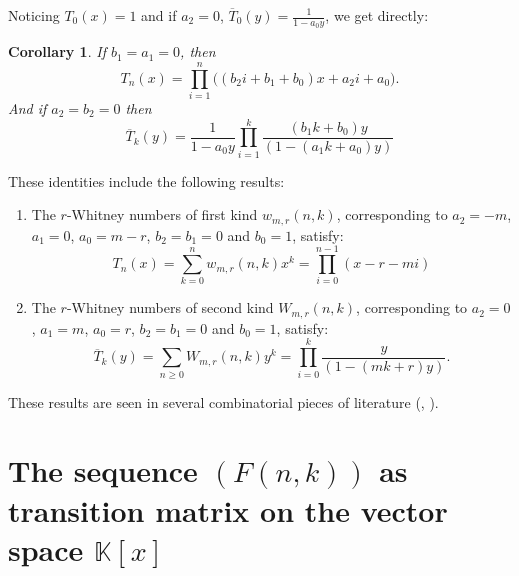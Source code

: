 \documentclass[12pt,a4paper]{article}
\newtheorem{corollary}[theorem]{Corollary}%
\theoremstyle{definition} %
\theoremstyle{remark}
\theoremstyle{examples}
\begin{document}
\noindent Noticing $T_0(x)=1$ and if $a_2=0$, $\overline{T}_0(y)=\frac{1}{1-a_0y}$, we get directly:
\begin{corollary}
	If $b_1=a_1=0$, then 
	\begin{equation}
	T_n(x)=\prod_{i=1}^n\big((b_2i+b_1+b_0)x+a_2i+a_0\big).
	\end{equation}
	And if $a_2=b_2=0$ then 
	\begin{equation}
\overline{T}_k(y)= \frac{1}{1-a_0y}\prod_{i=1}^k\frac{(b_1k+b_0)y}{(1-(a_1k+a_0)y)}
	\end{equation}
\end{corollary}
\noindent These identities include the following results:
\begin{enumerate}
	\item The $r$-Whitney numbers of first kind $w_{m,r}(n,k)$, corresponding to $a_2=-m$, $a_1=0$, $a_0=m-r$, $b_2=b_1=0$ and $b_0=1$,  satisfy:
	\begin{equation}\label{keystirlinnumber111}
T_n(x)=\sum_{k=0}^nw_{m,r}(n,k)x^k=\prod_{i=0}^{n-1}(x-r-mi)
	\end{equation}
	\item The $r$-Whitney numbers of second kind $W_{m,r}(n,k)$, corresponding to $a_2=0$, $a_1=m$, $a_0=r$, $b_2=b_1=0$ and $b_0=1$,  satisfy:
	\begin{equation} \label{keystirlinnumber112}
\overline{T}_k(y)=\sum_{n\geq 0}W_{m,r}(n,k)y^k=\prod_{i=0}^k\frac{y}{(1-(mk+r)y)}.
	\end{equation}
\end{enumerate}
These results are seen in several combinatorial pieces of literature (\cite{rabeza}, \cite{Cheon2012rWhitney}).
\section{The sequence $(F(n,k))$ as transition matrix on the vector space $\mathbb{K}[x]$}\label{sect3}
\end{document}

